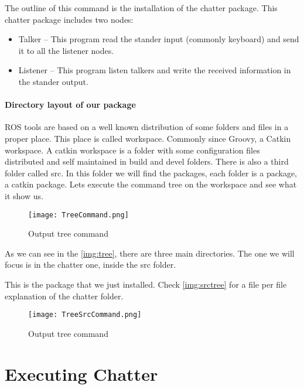 \documentclass[a4paper,10pt,twoside]{book}
\begin{document}
			The outline of this command is the installation of the chatter package. This chatter package includes two nodes:
				
				\begin{itemize}
					\item Talker	-- This program read the stander input (commonly keyboard) and send it to all the listener nodes.
					\item Listener	-- This program listen talkers and write the received information in the stander output.
				\end{itemize}
				
			
			\paragraph{Directory layout of our package}\label{package:layout}
			
				ROS tools are based on a well known distribution of some folders and files in a proper place.
				This place is called workspace. Commonly since Groovy, a Catkin workspace. 
				A catkin workspace is a folder with some configuration files distributed and self maintained in build and devel folders. There is also a third folder called src. In this folder we will find the packages, each folder is a package, a catkin package. 
				Lets execute the command tree on the workspace and see what it show us. 
				
				
			\begin{figure}[!htbp]
  				\centering
    				\texttt{[image: TreeCommand.png]}
				\caption{Output tree command \label{img:tree}}
				\centering
			\end{figure}
			\newpage
		
				As we can see in the \autoref{img:tree}, there are three main directories. The one we will focus is in the chatter one, inside the src folder. 
				
				This is the package that we just installed. Check \autoref{img:srctree} for a file per file explanation of the chatter folder.
								
								
			\begin{figure}[!htbp]
  				\centering
    				\texttt{[image: TreeSrcCommand.png]}
				\caption{Output tree command \label{img:srctree}}
				\centering
			\end{figure}
				
				
			\newpage
			\section{Executing Chatter}
			
\end{document}
